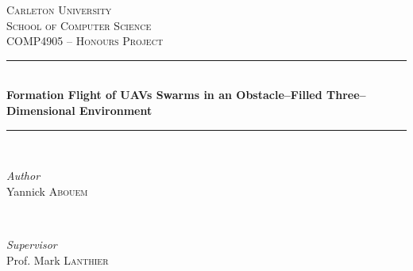 \begin{titlepage} %
	\newcommand{\HRule}{\rule{\linewidth}{0.5mm}} %
	
	\center %
	
	
	\textsc{\LARGE Carleton University}\\[1.5cm] %
	
	\textsc{\Large School of Computer Science}\\[0.5cm] %
	
	\textsc{\large COMP4905 -- Honours Project}\\[0.5cm] %
	
	
	\HRule\\[0.4cm]
	
	{\huge\bfseries Formation Flight of UAVs Swarms in an Obstacle--Filled Three--Dimensional Environment}\\[0.4cm] %
	
	\HRule\\[1.5cm]
	
	
	\begin{minipage}{0.4\textwidth}
		\begin{flushleft}
			\large
			\textit{Author}\\
			Yannick \textsc{Abouem} %
		\end{flushleft}
	\end{minipage}
	~
	\begin{minipage}{0.4\textwidth}
		\begin{flushright}
			\large
			\textit{Supervisor}\\
			Prof. Mark \textsc{Lanthier} %
		\end{flushright}
	\end{minipage}
	
	

\end{titlepage}
